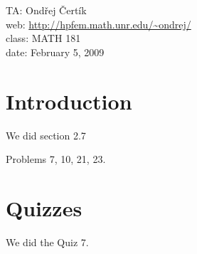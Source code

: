 \documentclass[10pt]{article}
\begin{document}
\noindent TA: Ondřej Čertík\\
web: \url{http://hpfem.math.unr.edu/~ondrej/}\\
class: MATH 181\\
date: February 5, 2009

\section{Introduction}

We did section 2.7

Problems 7, 10, 21, 23.

\section{Quizzes}

We did the Quiz 7.
\end{document}
